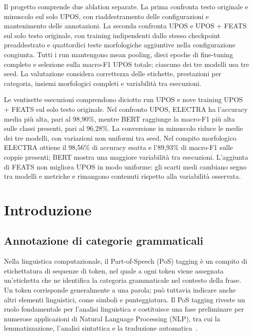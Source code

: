 \documentclass[12pt,a4paper]{report}
\begin{document}
Il progetto comprende due ablation separate. La prima confronta testo originale e minuscolo sul solo UPOS, con riaddestramento delle configurazioni e mantenimento delle annotazioni. La seconda confronta UPOS e UPOS + FEATS sul solo testo originale, con training indipendenti dallo stesso checkpoint preaddestrato e quattordici teste morfologiche aggiuntive nella configurazione congiunta. Tutti i run mantengono mean pooling, dieci epoche di fine-tuning completo e selezione sulla macro-F1 UPOS totale; ciascuno dei tre modelli usa tre seed. La valutazione considera correttezza delle etichette, prestazioni per categoria, insiemi morfologici completi e variabilità tra esecuzioni.

Le ventisette esecuzioni comprendono diciotto run UPOS e nove training UPOS + FEATS sul solo testo originale. Nel confronto UPOS, ELECTRA ha l'accuracy media più alta, pari al 98,90\%, mentre BERT raggiunge la macro-F1 più alta sulle classi presenti, pari al 96,28\%. La conversione in minuscolo riduce le medie dei tre modelli, con variazioni non uniformi tra seed. Nel compito morfologico ELECTRA ottiene il 98,56\% di accuracy esatta e l'89,93\% di macro-F1 sulle coppie presenti; BERT mostra una maggiore variabilità tra esecuzioni. L'aggiunta di FEATS non migliora UPOS in modo uniforme: gli scarti medi cambiano segno tra modelli e metriche e rimangono contenuti rispetto alla variabilità osservata.

\newpage
\begingroup\small\setlength{\parskip}{0pt}\tableofcontents\endgroup
\newpage
{}

\chapter{Introduzione}
\label{chap:introduction}
\section{Annotazione di categorie grammaticali}
\label{sec:grammatical-categories}

Nella linguistica computazionale, il Part-of-Speech (PoS) tagging è un compito di etichettatura di sequenze di token, nel quale a ogni token viene assegnata un'etichetta che ne identifica la categoria grammaticale nel contesto della frase. Un token corrisponde generalmente a una parola; può tuttavia indicare anche altri elementi linguistici, come simboli e punteggiatura. Il PoS tagging riveste un ruolo fondamentale per l'analisi linguistica e costituisce una fase preliminare per numerose applicazioni di Natural Language Processing (NLP), tra cui la lemmatizzazione, l'analisi sintattica e la traduzione automatica~\cite{manning2011}.
\end{document}
